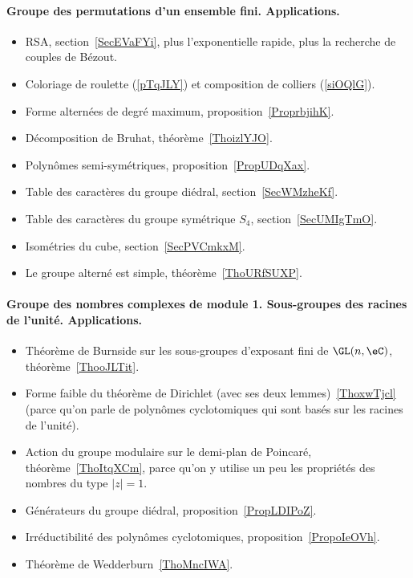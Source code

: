 \paragraph{Groupe des permutations d'un ensemble fini. Applications.}
\begin{itemize}
    \item RSA, section~\ref{SecEVaFYi}, plus l'exponentielle rapide, plus la recherche de couples de Bézout.
    \item Coloriage de roulette (\ref{pTqJLY}) et composition de colliers (\ref{siOQlG}).
    \item Forme alternées de degré maximum, proposition~\ref{ProprbjihK}.
    \item Décomposition de Bruhat, théorème~\ref{ThoizlYJO}.
    \item Polynômes semi-symétriques, proposition~\ref{PropUDqXax}.
    \item Table des caractères du groupe diédral, section~\ref{SecWMzheKf}.
    \item Table des caractères du groupe symétrique \( S_4\), section~\ref{SecUMIgTmO}.
    \item Isométries du cube, section~\ref{SecPVCmkxM}.
    \item Le groupe alterné est simple, théorème~\ref{ThoURfSUXP}.
\end{itemize}
\paragraph{Groupe des nombres complexes de module 1. Sous-groupes des racines de l'unité. Applications.}
\begin{itemize}
    \item Théorème de Burnside sur les sous-groupes d'exposant fini de \( \GL(n,\eC)\), théorème~\ref{ThooJLTit}.
    \item Forme faible du théorème de Dirichlet (avec ses deux lemmes)~\ref{ThoxwTjcl} (parce qu'on parle de polynômes cyclotomiques qui sont basés sur les racines de l'unité).
    \item Action du groupe modulaire sur le demi-plan de Poincaré, théorème~\ref{ThoItqXCm}, parce qu'on y utilise un peu les propriétés des nombres du type \( | z |=1\).
    \item Générateurs du groupe diédral, proposition~\ref{PropLDIPoZ}.
    \item Irréductibilité des polynômes cyclotomiques, proposition~\ref{PropoIeOVh}.
    \item Théorème de Wedderburn~\ref{ThoMncIWA}.
\end{itemize}
